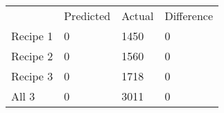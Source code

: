 \begin{table}
    \begin{tabular}{llll}
    ~        & Predicted & Actual & Difference \\
    Recipe 1 & 0         & 1450   & 0          \\
    Recipe 2 & 0         & 1560   & 0          \\
    Recipe 3 & 0         & 1718   & 0          \\
    All 3    & 0         & 3011   & 0          \\
    \end{tabular}
\end{table}